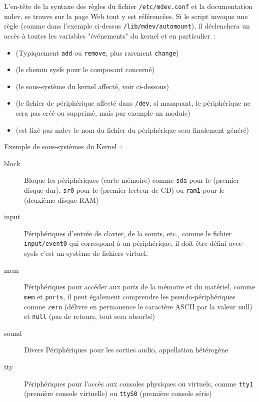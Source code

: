 L'en-tête de la syntaxe des règles du fichier \texttt{/etc/mdev.conf}
et la documentation mdev, se trouve sur la page Web
 tout y est référencées.
Si le script invoque une règle (comme dans l'exemple ci-dessus \texttt{/lib/mdev/automount}),
il déclenchera un accès à toutes les variables "événements" du kernel et en particulier~:

\begin{itemize}
\item {} (Typiquement \texttt{add} ou \texttt{remove}, plus rarement \texttt{change})
\item {} (le chemin sysfs pour le composant concerné)
\item {} (le sous-système du kernel affecté, voir ci-dessous)
\item {} (le fichier de périphérique affecté dans \texttt{/dev}, si manquant,
					le périphérique ne sera pas créé ou supprimé, mais par exemple un module)
\item {} (est fixé par mdev le nom du fichier du périphérique sera finalement généré)
\end{itemize}

Exemple de sous-systèmes du Kernel~:

\begin{description}
\item[block] Bloque les périphériques (carte mémoire) comme \texttt{sda} pour le (premier
			 disque dur), \texttt{sr0} pour le (premier lecteur de CD) ou \texttt{ram1}
			 pour le (deuxième disque RAM)
\item[input] Périphériques d'entrée de clavier, de la souris, etc., comme le fichier
			 \texttt{input/event0} qui correspond à un périphérique, il doit être défini
			 avec sysfs c'est un système de fichiers virtuel.
\item[mem]   Périphériques pour accéder aux ports de la mémoire et du matériel, comme
			 \texttt{mem} et \texttt{ports}, il peut également comprendre les pseudo-périphériques
			 comme \texttt{zero} (délivre en permanence le caractère ASCII par la valeur null)
			 et \texttt{null} (pas de retours, tout sera absorbé)
\item[sound] Divers Périphériques pour les sorties audio, appellation hétérogène
\item[tty]   Périphériques pour l'accès aux consoles physiques ou virtuels, comme \texttt{tty1}
			 (première console virtuelle) ou \texttt{ttyS0} (première console série)
\end{description}

